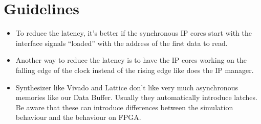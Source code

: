 \chapter{Guidelines}\label{Guidelines}
\begin{itemize}
\item To reduce the latency, it's better if the synchronous IP cores start with the interface signals ``loaded'' with the address of the first data to read.
\item Another way to reduce the latency is to have the IP cores working on the falling edge of the clock instead of the rising edge like does the IP manager.
\item Synthesizer like Vivado and Lattice don't like very much asynchronous memories like our Data Buffer. Usually they automatically introduce latches. Be aware that these can introduce differences between the simulation behaviour and the behaviour on FPGA.
\end{itemize}